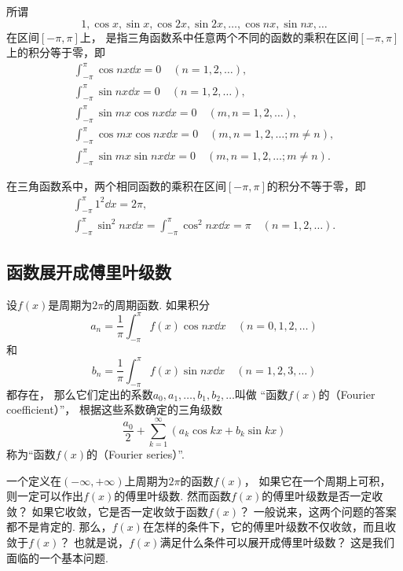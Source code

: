 \begin{definition}
所谓\[
1, \cos x, \sin x, \cos 2x, \sin 2x, \dotsc, \cos nx, \sin nx, \dotsc
\]在区间\([-\pi,\pi]\)上，
是指三角函数系中任意两个不同的函数的乘积在区间\([-\pi,\pi]\)上的积分等于零，即
\begin{gather*}
	\int_{-\pi}^\pi \cos{nx} \dd{x} = 0 \quad(n=1,2,\dotsc), \\
	\int_{-\pi}^\pi \sin{nx} \dd{x} = 0 \quad(n=1,2,\dotsc), \\
	\int_{-\pi}^\pi \sin{mx}\cos{nx} \dd{x} = 0 \quad(m,n=1,2,\dotsc), \\
	\int_{-\pi}^\pi \cos{mx}\cos{nx} \dd{x} = 0 \quad(m,n=1,2,\dotsc; m \neq n), \\
	\int_{-\pi}^\pi \sin{mx}\sin{nx} \dd{x} = 0 \quad(m,n=1,2,\dotsc; m \neq n).
\end{gather*}

在三角函数系中，两个相同函数的乘积在区间\([-\pi,\pi]\)的积分不等于零，即
\begin{gather*}
\int_{-\pi}^\pi 1^2 \dd{x} = 2\pi, \\
\int_{-\pi}^\pi \sin^2 nx \dd{x} = \int_{-\pi}^\pi \cos^2 nx \dd{x} = \pi \quad(n=1,2,\dotsc).
\end{gather*}
\end{definition}

\subsection{函数展开成傅里叶级数}
\begin{definition}\label{definition:无穷级数.傅里叶级数}
设\(f(x)\)是周期为\(2 \pi\)的周期函数.
如果积分\[
a_n = \frac{1}{\pi} \int_{-\pi}^\pi f(x) \cos nx \dd{x} \quad(n=0,1,2,\dotsc)
\]和\[
b_n = \frac{1}{\pi} \int_{-\pi}^\pi f(x) \sin nx \dd{x} \quad(n=1,2,3,\dotsc)
\]都存在，
那么它们定出的系数\(a_0,a_1,\dotsc,b_1,b_2,\dotsc\)叫做%
“函数\(f(x)\)的（Fourier coefficient）”，
根据这些系数确定的三角级数\[
\frac{a_0}{2} + \sum\limits_{k=1}^\infty (a_k \cos{kx} + b_k \sin kx)
\]称为“函数\(f(x)\)的（Fourier series）”.
\end{definition}

一个定义在\((-\infty,+\infty)\)上周期为\(2\pi\)的函数\(f(x)\)，
如果它在一个周期上可积，
则一定可以作出\(f(x)\)的傅里叶级数.
然而函数\(f(x)\)的傅里叶级数是否一定收敛？
如果它收敛，它是否一定收敛于函数\(f(x)\)？
一般说来，这两个问题的答案都不是肯定的.
那么，\(f(x)\)在怎样的条件下，它的傅里叶级数不仅收敛，而且收敛于\(f(x)\)？
也就是说，\(f(x)\)满足什么条件可以展开成傅里叶级数？
这是我们面临的一个基本问题.


